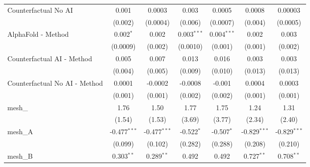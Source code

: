 \begin{tabular}{lcccccc}
   Counterfactual No AI                                        & 0.001          & 0.0003         & 0.003          & 0.0005         & 0.0008         & 0.00003\\   
                                                               & (0.002)        & (0.0004)       & (0.006)        & (0.0007)       & (0.004)        & (0.0005)\\   
   AlphaFold - Method                                          & 0.002$^{*}$    & 0.002          & 0.003$^{***}$  & 0.004$^{***}$  & 0.002          & 0.003\\   
                                                               & (0.0009)       & (0.002)        & (0.0010)       & (0.001)        & (0.001)        & (0.002)\\   
   Counterfactual AI - Method                                  & 0.005          & 0.007          & 0.013          & 0.016          & 0.003          & 0.003\\   
                                                               & (0.004)        & (0.005)        & (0.009)        & (0.010)        & (0.013)        & (0.013)\\   
   Counterfactual No AI - Method                               & 0.0001         & -0.0002        & -0.0008        & -0.001         & 0.0004         & 0.0003\\   
                                                               & (0.001)        & (0.001)        & (0.002)        & (0.002)        & (0.001)        & (0.001)\\   
   mesh\_                                                      & 1.76           & 1.50           & 1.77           & 1.75           & 1.24           & 1.31\\   
                                                               & (1.54)         & (1.53)         & (3.69)         & (3.77)         & (2.34)         & (2.40)\\   
   mesh\_A                                                     & -0.477$^{***}$ & -0.477$^{***}$ & -0.522$^{*}$   & -0.507$^{*}$   & -0.829$^{***}$ & -0.829$^{***}$\\   
                                                               & (0.099)        & (0.102)        & (0.282)        & (0.288)        & (0.208)        & (0.210)\\   
   mesh\_B                                                     & 0.303$^{**}$   & 0.289$^{**}$   & 0.492          & 0.492          & 0.727$^{**}$   & 0.708$^{**}$\\   

\end{tabular}

